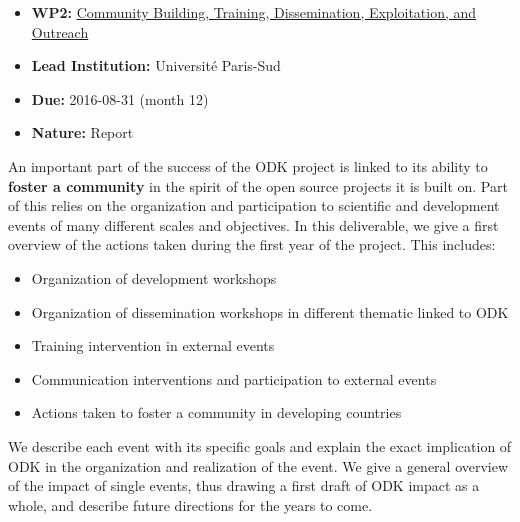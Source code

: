 \begin{itemize}
\itemsep1pt\parskip0pt
\item
  \textbf{WP2:}
  \href{https://github.com/OpenDreamKit/OpenDreamKit/tree/master/WP2}{Community
  Building, Training, Dissemination, Exploitation, and Outreach}\\
\item
  \textbf{Lead Institution:} Université Paris-Sud\\
\item
  \textbf{Due:} 2016-08-31 (month 12)\\
\item
  \textbf{Nature:} Report
\end{itemize}

An important part of the success of the ODK project is linked to its
ability to \textbf{foster a community} in the spirit of the open source
projects it is built on. Part of this relies on the organization and
participation to scientific and development events of many different
scales and objectives. In this deliverable, we give a first overview of
the actions taken during the first year of the project. This includes:

\begin{itemize}
\itemsep1pt\parskip0pt
\item
  Organization of development workshops\\
\item
  Organization of dissemination workshops in different thematic linked
  to ODK\\
\item
  Training intervention in external events\\
\item
  Communication interventions and participation to external events\\
\item
  Actions taken to foster a community in developing countries
\end{itemize}

We describe each event with its specific goals and explain the exact
implication of ODK in the organization and realization of the event. We
give a general overview of the impact of single events, thus drawing a
first draft of ODK impact as a whole, and describe future directions for
the years to come.
